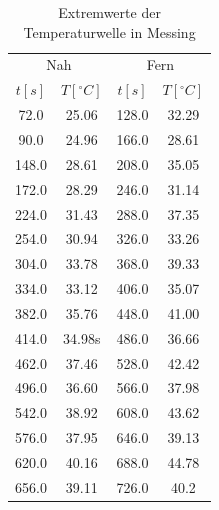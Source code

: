 \documentclass[11pt]{article}
\begin{document}
\begin{table}[P]
\centering
\label{messing_extr}
\begin{tabular}{c|c||c|c}
\multicolumn{2}{c||}{Nah} & \multicolumn{2}{c}{Fern}\\
$t[s]$ & $T[^\circ C]$ & $t[s]$ & $T[^\circ C]$ \\
\hline
72.0 & 25.06 & 128.0 & 32.29\\
90.0 & 24.96 & 166.0 & 28.61\\
148.0 & 28.61 & 208.0 & 35.05\\
172.0 & 28.29 & 246.0 & 31.14\\
224.0 & 31.43 & 288.0 & 37.35\\
254.0 & 30.94 & 326.0 & 33.26\\
304.0 & 33.78 & 368.0 & 39.33\\
334.0 & 33.12 & 406.0 & 35.07\\
382.0 & 35.76 & 448.0 & 41.00\\
414.0 & 34.98s & 486.0 & 36.66\\
462.0 & 37.46 & 528.0 & 42.42\\
496.0 & 36.60 & 566.0 & 37.98\\
542.0 & 38.92 & 608.0 & 43.62\\
576.0 & 37.95 & 646.0 & 39.13\\
620.0 & 40.16 & 688.0 & 44.78\\
656.0 & 39.11 & 726.0 & 40.2\\

\end{tabular}
\caption{Extremwerte der Temperaturwelle in Messing}
\end{table}
\end{document}
